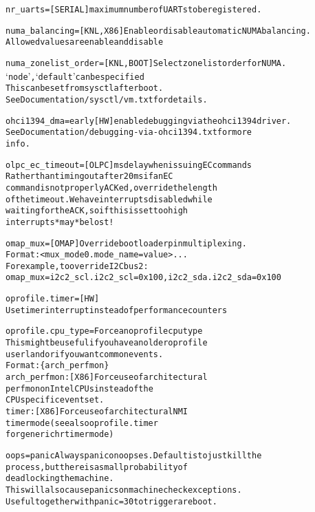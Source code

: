 \documentclass[a4paper,8pt,english]{sphinxmanual}
\begin{document}
\begin{alltt}
        nr\_uarts=       {[}SERIAL{]} maximum number of UARTs to be registered.

        numa\_balancing= {[}KNL,X86{]} Enable or disable automatic NUMA balancing.
                        Allowed values are enable and disable

        numa\_zonelist\_order= {[}KNL, BOOT{]} Select zonelist order for NUMA.
                        `node', `default' can be specified
                        This can be set from sysctl after boot.
                        See Documentation/sysctl/vm.txt for details.

        ohci1394\_dma=early      {[}HW{]} enable debugging via the ohci1394 driver.
                        See Documentation/debugging-via-ohci1394.txt for more
                        info.

        olpc\_ec\_timeout= {[}OLPC{]} ms delay when issuing EC commands
                        Rather than timing out after 20 ms if an EC
                        command is not properly ACKed, override the length
                        of the timeout.  We have interrupts disabled while
                        waiting for the ACK, so if this is set too high
                        interrupts *may* be lost!

        omap\_mux=       {[}OMAP{]} Override bootloader pin multiplexing.
                        Format: \textless{}mux\_mode0.mode\_name=value\textgreater{}...
                        For example, to override I2C bus2:
                        omap\_mux=i2c2\_scl.i2c2\_scl=0x100,i2c2\_sda.i2c2\_sda=0x100

        oprofile.timer= {[}HW{]}
                        Use timer interrupt instead of performance counters

        oprofile.cpu\_type=      Force an oprofile cpu type
                        This might be useful if you have an older oprofile
                        userland or if you want common events.
                        Format: \{ arch\_perfmon \}
                        arch\_perfmon: {[}X86{]} Force use of architectural
                                perfmon on Intel CPUs instead of the
                                CPU specific event set.
                        timer: {[}X86{]} Force use of architectural NMI
                                timer mode (see also oprofile.timer
                                for generic hr timer mode)

        oops=panic      Always panic on oopses. Default is to just kill the
                        process, but there is a small probability of
                        deadlocking the machine.
                        This will also cause panics on machine check exceptions.
                        Useful together with panic=30 to trigger a reboot.


\end{alltt}
\end{document}
